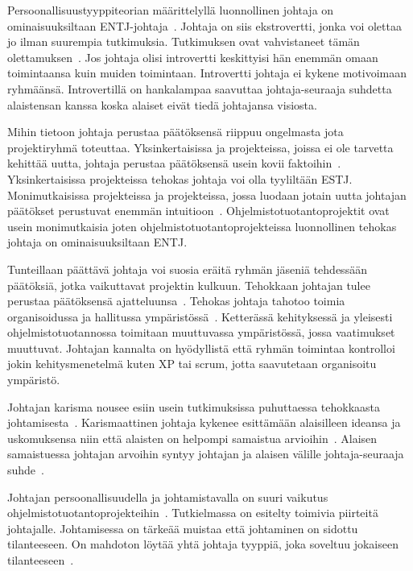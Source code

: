 \documentclass[finnish]{tktltiki2}
\theoremstyle{definition}
\theoremstyle{remark}
\begin{document}
Persoonallisuustyyppiteorian määrittelyllä luonnollinen johtaja on ominaisuuksiltaan ENTJ-johtaja~\cite{bradley1997effect}. Johtaja on siis ekstrovertti, jonka voi olettaa jo ilman suurempia tutkimuksia. Tutkimuksen ovat vahvistaneet tämän olettamuksen~\cite{bradley1997effect}. Jos johtaja olisi introvertti keskittyisi hän enemmän omaan toimintaansa kuin muiden toimintaan. Introvertti johtaja ei kykene motivoimaan ryhmäänsä. Introvertillä on hankalampaa saavuttaa johtaja-seuraaja suhdetta alaistensan kanssa koska alaiset eivät tiedä johtajansa visiosta.

Mihin tietoon johtaja perustaa päätöksensä riippuu ongelmasta jota projektiryhmä toteuttaa. Yksinkertaisissa ja projekteissa, joissa ei ole tarvetta kehittää uutta, johtaja perustaa päätöksensä usein kovii faktoihin~\cite{bradley1997effect}. Yksinkertaisissa projekteissa tehokas johtaja voi olla tyyliltään ESTJ. Monimutkaisissa projekteissa ja projekteissa, jossa luodaan jotain uutta johtajan päätökset perustuvat enemmän intuitioon~\cite{bradley1997effect}. Ohjelmistotuotantoprojektit ovat usein monimutkaisia joten ohjelmistotuotantoprojekteissa luonnollinen tehokas johtaja on ominaisuuksiltaan ENTJ.

Tunteillaan päättävä johtaja voi suosia eräitä ryhmän jäseniä tehdessään päätöksiä, jotka vaikuttavat projektin kulkuun. Tehokkaan johtajan tulee perustaa päätöksensä ajatteluunsa~\cite{bradley1997effect}. Tehokas johtaja tahotoo toimia organisoidussa ja hallitussa ympäristössä~\cite{bradley1997effect}. Ketterässä kehityksessä ja yleisesti ohjelmistotuotannossa toimitaan muuttuvassa ympäristössä, jossa vaatimukset muuttuvat. Johtajan kannalta on hyödyllistä että ryhmän toimintaa kontrolloi jokin kehitysmenetelmä kuten XP tai scrum, jotta saavutetaan organisoitu ympäristö.

Johtajan karisma nousee esiin usein tutkimuksissa puhuttaessa tehokkaasta johtamisesta~\cite{Dhomne:2012:ITL:2382887.2382899, thite2000leadership}. Karismaattinen johtaja kykenee esittämään alaisilleen ideansa ja uskomuksensa niin että alaisten on helpompi samaistua arvioihin~\cite{thite2000leadership}. Alaisen samaistuessa johtajan arvoihin syntyy johtajan ja alaisen välille johtaja-seuraaja suhde~\cite{raccoon2006leadership}.

Johtajan persoonallisuudella ja johtamistavalla on suuri vaikutus ohjelmistotuotantoprojekteihin~\cite{Wang:2009:PMP:1639950.1640049}. Tutkielmassa on esitelty toimivia piirteitä johtajalle. Johtamisessa on tärkeää muistaa että johtaminen on sidottu tilanteeseen. On mahdoton löytää yhtä johtaja tyyppiä, joka soveltuu jokaiseen tilanteeseen~\cite{thite2000leadership}.
\end{document}
